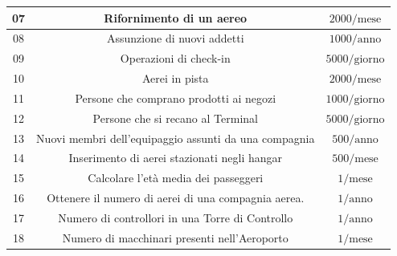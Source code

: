 \begin{tabular}{ | c c c |}
	\hline
	\textsf{\small 07} & \textsf{\small Rifornimento di un aereo} & \textsf{\small $ 2000/ \text{mese} $} \\
	\hline
	\textsf{\small 08} & \textsf{\small Assunzione di nuovi addetti} & \textsf{\small $ 1000 / \text{anno}$} \\
	\hline
	\textsf{\small 09} & \textsf{\small Operazioni di check-in} & \textsf{\small $ 5000 / \text{giorno}$} \\
	\hline
	\textsf{\small 10} & \textsf{\small Aerei in pista} & \textsf{\small $ 2000 / \text{mese}$} \\
	\hline
	\textsf{\small 11} & \textsf{\small Persone che comprano prodotti ai negozi} & \textsf{\small $ 1000 / \text{giorno} $} \\ %
	\hline
	\textsf{\small 12} & \textsf{\small Persone che si recano al Terminal} & \textsf{\small $ 5000 / \text{giorno} $} \\
	\hline
	\textsf{\small 13} & \textsf{\small Nuovi membri dell'equipaggio assunti da una compagnia} & \textsf{\small $ 500 / \text{anno}$} \\ %
	\hline
	\textsf{\small 14} & \textsf{\small Inserimento di aerei stazionati negli hangar} & \textsf{\small $ 500 / \text{mese} $} \\ %
	\hline
	\textsf{\small 15} & \textsf{\small Calcolare l'età media dei passeggeri} & \textsf{\small $ 1 / \text{mese} $} \\
	\hline
	\textsf{\small 16} & \textsf{\small Ottenere il numero di aerei di una compagnia aerea.} & \textsf{\small $ 1 / \text{anno} $} \\
	\hline
	\textsf{\small 17} & \textsf{\small Numero di controllori in una Torre di Controllo} & \textsf{\small $ 1 / \text{anno} $} \\
	\hline
	\textsf{\small 18} & \textsf{\small Numero di macchinari presenti nell'Aeroporto} & \textsf{\small $ 1 / \text{mese} $} \\

\end{tabular}
